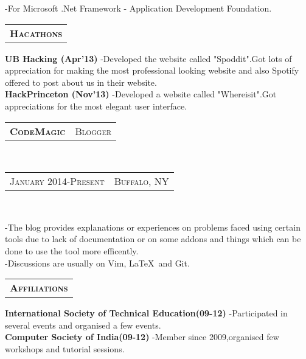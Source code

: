 \documentclass[10pt,a4paper,oneside]{article}
\begin{document}
\begin{minipage}[t]{0.33\textwidth}
\begin{adjustwidth}{7pt}{0pt}
{        -For Microsoft .Net Framework - Application Development Foundation.}
        \end{adjustwidth}
        \vspace{10pt}
        \begin{tabular}{c}
        \textbf{\normalsize H\textsc{acathons}}\\
        \end{tabular}
        \begin{adjustwidth}{7pt}{0pt}
            {\footnotesize \textbf{UB Hacking (Apr'13)} -Developed the website called "Spoddit".Got lots of appreciation for 
            making the most professional looking website and also Spotify offered to post
        about us in their website.}\\
            {\footnotesize \textbf{HackPrinceton (Nov'13)} -Developed a website called "Whereisit".Got appreciations for the
            most elegant user interface.}
            \vspace{0pt}\\
        \end{adjustwidth}
        \begin{tabular}{c|c}
            \textbf{\normalsize C\textsc{ode}M\textsc{agic}}
            &\textmd{\normalsize B\textsc{logger}}
        \end{tabular}\\
        \textcolor{light-gray}{
            \begin{tabular}{c|c}
                {\small J\textsc{anuary 2014}-P\textsc{resent}}
                &{\small B\textsc{uffalo}, NY}
            \end{tabular}
        }\\ 
        \vspace{-4mm}
        \begin{adjustwidth}{7pt}{0pt}
            {\footnotesize -The blog provides explanations or experiences on problems faced using certain tools due to lack
            of documentation or on some addons and things which can be done to use the tool more efficently.}\\
            {\footnotesize -Discussions are usually on Vim, \LaTeX \  and Git. }
        \end{adjustwidth}
        \vspace{10pt}
        \begin{tabular}{c}
        \textbf{\normalsize A\textsc{ffiliations}}\\
        \end{tabular}
        \begin{adjustwidth}{7pt}{0pt}
            {\footnotesize \textbf{International Society of Technical Education(09-12)} -Participated in several events and
            organised a few events.}\\
            {\footnotesize \textbf{Computer Society of India(09-12)} -Member since 2009,organised few workshops and
        tutorial sessions.}
            \vspace{0pt}\\
        \end{adjustwidth} 
    \end{minipage}
\end{document}
